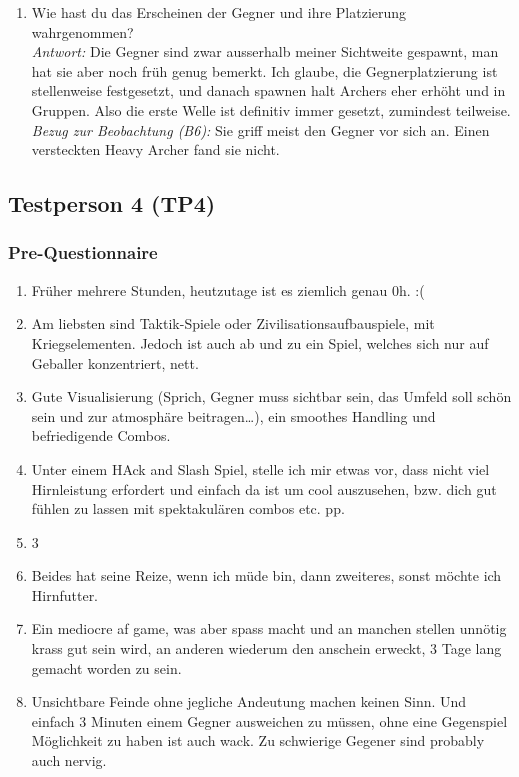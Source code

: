 \documentclass[../Main.tex]{subfiles}
\begin{document}
\begin{enumerate}[label=\textbf{I\arabic*}, leftmargin=1.5cm, itemsep=1em]
\item Wie hast du das Erscheinen der Gegner und ihre Platzierung wahrgenommen? \\
\textit{Antwort:} Die Gegner sind zwar ausserhalb meiner Sichtweite gespawnt, man hat sie aber noch früh genug bemerkt. Ich glaube, die Gegnerplatzierung ist stellenweise festgesetzt, und danach spawnen halt Archers eher erhöht und in Gruppen. Also die erste Welle ist definitiv immer gesetzt, zumindest teilweise. \\
\textit{Bezug zur Beobachtung (B6):} Sie griff meist den Gegner vor sich an. Einen versteckten Heavy Archer fand sie nicht.
\end{enumerate}

\subsection{Testperson 4 (TP4)}

\subsubsection{Pre-Questionnaire}

\begin{enumerate}[label=\textbf{P\arabic*}, leftmargin=1.5cm, itemsep=0.5em]
\item Früher mehrere Stunden, heutzutage ist es ziemlich genau 0h. :(
\item Am liebsten sind Taktik-Spiele oder Zivilisationsaufbauspiele, mit Kriegselementen. Jedoch ist auch ab und zu ein Spiel, welches sich nur auf Geballer konzentriert, nett.
\item Gute Visualisierung (Sprich, Gegner muss sichtbar sein, das Umfeld soll schön sein und zur atmosphäre beitragen…), ein smoothes Handling und befriedigende Combos.
\item Unter einem HAck and Slash Spiel, stelle ich mir etwas vor, dass nicht viel Hirnleistung erfordert und einfach da ist um cool auszusehen, bzw. dich gut fühlen zu lassen mit spektakulären combos etc. pp.
\item 3
\item Beides hat seine Reize, wenn ich müde bin, dann zweiteres, sonst möchte ich Hirnfutter.
\item Ein mediocre af game, was aber spass macht und an manchen stellen unnötig krass gut sein wird, an anderen wiederum den anschein erweckt, 3 Tage lang gemacht worden zu sein.
\item Unsichtbare Feinde ohne jegliche Andeutung machen keinen Sinn. Und einfach 3 Minuten einem Gegner ausweichen zu müssen, ohne eine Gegenspiel Möglichkeit zu haben ist auch wack. Zu schwierige Gegener sind probably auch nervig.
\end{enumerate}
\end{document}
